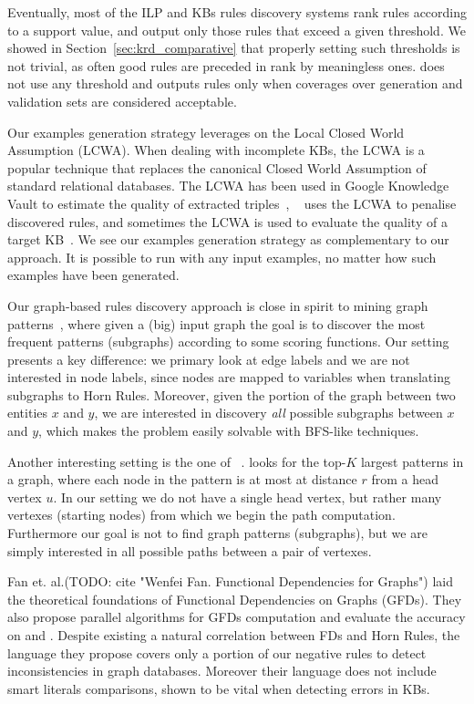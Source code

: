 Eventually, most of the ILP and KBs rules discovery systems rank rules according to a support value, and output only those rules that exceed a given threshold. We showed in Section~\ref{sec:krd_comparative} that properly setting such thresholds is not trivial, as often good rules are preceded in rank by meaningless ones. \krd does not use any threshold and outputs rules only when coverages over generation and validation sets are considered acceptable.

Our examples generation strategy leverages on the Local Closed World Assumption (LCWA). When dealing with incomplete KBs, the LCWA is a popular technique that replaces the canonical Closed World Assumption of standard relational databases. The LCWA has been used in Google Knowledge Vault to estimate the quality of extracted triples~\cite{dong2014data,dong2014knowledge}, \amie~\cite{galarraga2015fast} uses the LCWA to penalise discovered rules, and sometimes the LCWA is used to evaluate the quality of a target KB~\cite{dong2015knowledge}. We see our examples generation strategy as complementary to our approach. It is possible to run \krd with any input examples, no matter how such examples have been generated.

Our graph-based rules discovery approach is close in spirit to mining graph patterns~\cite{elseidy2014grami,zou2009distance}, where given a (big) input graph the goal is to discover the most frequent patterns (subgraphs) according to some scoring functions. Our setting presents a key difference: we primary look at edge labels and we are not interested in node labels, since nodes are mapped to variables when translating subgraphs to Horn Rules. Moreover, given the portion of the graph between two entities $x$ and $y$, we are interested in discovery \emph{all} possible subgraphs between $x$ and $y$, which makes the problem easily solvable with BFS-like techniques.

Another interesting setting is the one of ~\cite{zhu2011mining}.  looks for the top-$K$ largest patterns in a graph, where each node in the pattern is at most at distance $r$ from a head vertex $u$. In our setting we do not have a single head vertex, but rather many vertexes (starting nodes) from which we begin the path computation. Furthermore our goal is not to find graph patterns (subgraphs), but we are simply interested in all possible paths between a pair of vertexes.

Fan et. al.(TODO: cite "Wenfei Fan. Functional Dependencies for Graphs") laid the theoretical foundations of Functional Dependencies on Graphs (GFDs). They also propose parallel algorithms for GFDs computation and evaluate the accuracy on \yago and \dbpedia. Despite existing a natural correlation between FDs and Horn Rules, the language they propose covers only a portion of our negative rules to detect inconsistencies in graph databases. Moreover their language does not include smart literals comparisons, shown to be vital when detecting errors in KBs.
